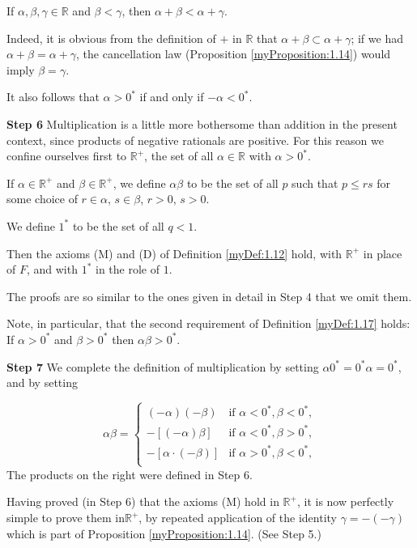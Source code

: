 If $\alpha, \beta, \gamma \in \mathbb{R}$ and $\beta < \gamma$, then $\alpha + \beta < \alpha + \gamma$.

Indeed, it is obvious from the definition of $+$ in $\mathbb{R}$ that $\alpha + \beta \subset \alpha + \gamma$; if we had $\alpha + \beta = \alpha + \gamma$, the cancellation law (Proposition \ref{myProposition:1.14}) would imply $\beta = \gamma$.

It also follows that $\alpha > 0^*$ if and only if $-\alpha < 0^*$.

\textbf{Step 6} Multiplication is a little more bothersome than addition in the present context, since products of negative rationals are positive. For this reason we confine ourselves first to $\mathbb{R}^+$, the set of all $\alpha \in \mathbb{R}$ with $\alpha > 0^*$.

If $\alpha \in \mathbb{R}^+$ and $\beta \in \mathbb{R}^+$, we define $\alpha\beta$ to be the set of all $p$ such that $p \leq rs$
for some choice of $r \in \alpha$, $s \in \beta$, $r>0$, $s>0$.

We define $1^*$ to be the set of all $q < 1$.


Then the axioms (M) and (D) of Definition \ref{myDef:1.12} hold, with $\mathbb{R}^+$ in place of $F$, and with $1^*$ in the role of $1$.

The proofs are so similar to the ones given in detail in Step 4 that we omit
them.

Note, in particular, that the second requirement of Definition \ref{myDef:1.17} holds:
If $\alpha > 0^*$ and $\beta > 0^*$ then $\alpha\beta > 0^*$.

\textbf{Step 7} We complete the definition of multiplication by setting $\alpha 0^* = 0^* \alpha = 0^*$,
and by setting

\begin{equation*}
    \alpha\beta = \left\{
        \begin{array}{ll}
            (-\alpha)(-\beta) & \text{if } \alpha < 0^*, \beta < 0^*,\\
            -[(-\alpha)\beta] & \text{if } \alpha < 0^*, \beta > 0^*,\\
            -[\alpha\cdot(-\beta)] & \text{if } \alpha > 0^*, \beta < 0^*,\\
        \end{array}
    \right.
\end{equation*}
The products on the right were defined in Step 6.

Having proved (in Step 6) that the axioms (M) hold in $\mathbb{R}^+$, it is now
perfectly simple to prove them in$\mathbb{\mathbb{R}^+}$, by repeated application of the identity $\gamma = -(-\gamma)$ which is part of Proposition \ref{myProposition:1.14}. (See Step 5.)

